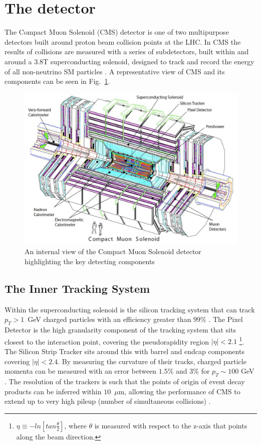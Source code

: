 \section{The \CMS detector} \label{sec:cms}

The Compact Muon Solenoid (CMS) detector is one of two multipurpose
detectors built around proton beam collision points at the LHC. In CMS
the results of collisions are measured with a series of subdetectors,
built within and around a 3.8T superconducting solenoid, designed to
track and record the energy of all non-neutrino SM particles
\cite{Bayatian:2006zz}. A representative view of CMS
and its components can be seen in Fig.~\ref{fig:CMS}.  \begin{figure}
\begin{center} \includegraphics[width=0.8\linewidth]{figs/cms_detector}
\end{center} \caption{An internal view of the Compact Muon Solenoid
detector highlighting the key detecting components
\cite{Bayatian:2006zz}} \label{fig:CMS} \end{figure}

\subsection{The Inner Tracking System} Within the superconducting
solenoid is the silicon tracking system that can track
\mbox{$p_T>1$~GeV} charged particles with an efficiency greater than
$99\%$ \cite{Bayatian:2006zz}.
The Pixel Detector is the high granularity component of the tracking
system that sits closest to the interaction point, covering the
pseudorapidity region $|\eta|<2.1$ \footnote{$\eta \equiv
-ln[tan\frac{\theta}{2}]$, where $\theta$ is measured with respect to
the z-axis that points along the beam direction.}. The Silicon Strip
Tracker sits around this with barrel and endcap components covering
$|\eta|<2.4$. By measuring the curvature of their tracks, charged
particle momenta can be measured with an error between $1.5\%$ and
$3\%$ for $p_T\sim 100$ GeV \cite{Adam_Elwood_MSci}. The resolution of
the trackers is such that the points of origin of event decay products
can be inferred within $10$~$\mu$m, allowing the performance of CMS to
extend up to very high pileup (number of simultaneous collisions)
\cite{CMSTrackPerformance}.

